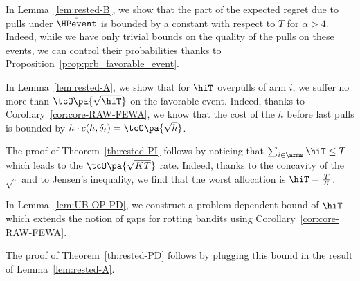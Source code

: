 In Lemma~\ref{lem:rested-B}, we show that the part of the expected regret due to pulls under $\bar{\HPevent}$ is bounded by a constant with respect to $T$ for $\alpha > 4$. Indeed, while we have only trivial bounds on the quality of the pulls on these events, we can control their probabilities thanks to Proposition~\ref{prop:prb_favorable_event}.

In Lemma~\ref{lem:rested-A}, we show that for $\hiT$ overpulls of arm $i$, we suffer no more than $\tcO\pa{\sqrt{\hiT}}$ on the favorable event. Indeed, thanks to Corollary~\ref{cor:core-RAW-FEWA}, we know that the cost of the $h$ before last pulls is bounded by $h \cdot c(h, \delta_t) = \tcO\pa{\sqrt{h}}$.

The proof of Theorem~\ref{th:rested-PI} follows by noticing that $\sum_{i \in \arms} \hiT \leq T$ which leads to the $\tcO\pa{\sqrt{KT}}$ rate. Indeed, thanks to the concavity of the $\sqrt{\cdot}$ and to Jensen's inequality, we find that the worst allocation is $\hiT = \frac{T}{K}$.

In Lemma~\ref{lem:UB-OP-PD}, we construct a problem-dependent bound of $\hiT$ which extends the notion of gaps for rotting bandits using Corollary~\ref{cor:core-RAW-FEWA}.

The proof of Theorem~\ref{th:rested-PD} follows by plugging this bound in the result of Lemma~\ref{lem:rested-A}.
%
